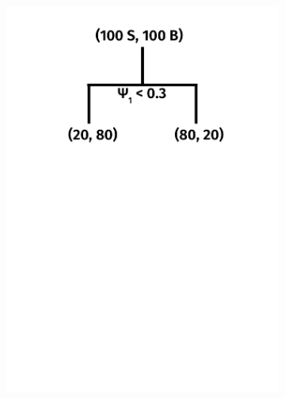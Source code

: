\begin{figure}[]
    \begin{center}
        \begin{subfigure}[t]{0.32\textwidth}
            \includegraphics[width=\textwidth]{figures/toptagging/bdt/tree0.pdf}
        \end{subfigure}
        \begin{subfigure}[t]{0.32\textwidth}

\end{subfigure}
\end{center}
\end{figure}
